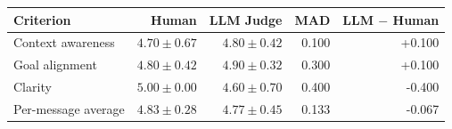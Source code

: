 \begin{tabular}{lrrrr}
\toprule
Criterion & Human & LLM Judge & MAD & LLM $-$ Human \\
\midrule
Context awareness & $4.70\pm0.67$ & $4.80\pm0.42$ & 0.100 & +0.100 \\
Goal alignment & $4.80\pm0.42$ & $4.90\pm0.32$ & 0.300 & +0.100 \\
Clarity & $5.00\pm0.00$ & $4.60\pm0.70$ & 0.400 & -0.400 \\
Per-message average & $4.83\pm0.28$ & $4.77\pm0.45$ & 0.133 & -0.067 \\
\bottomrule
\end{tabular}
